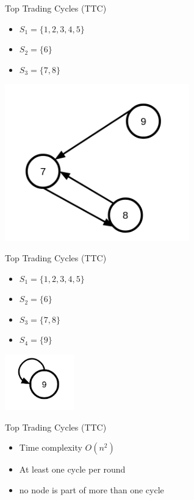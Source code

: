 \begin{frame}{Top Trading Cycles (TTC)}
    \begin{itemize}
    \item $S_1 = \{1,2,3,4,5\}$
    \item $S_2 = \{6\}$
    \item <2-> $S_3 = \{7,8\}$
    \end{itemize}   
    \centering
    \includegraphics[width=8cm]{img/ttc/ttc4.png}
\end{frame}
\begin{frame}{Top Trading Cycles (TTC)}
    \begin{itemize}
    \item $S_1 = \{1,2,3,4,5\}$
    \item $S_2 = \{6\}$
    \item $S_3 = \{7,8\}$
    \item <2-> $S_4 = \{9\}$
    \end{itemize}  
    \centering
    \includegraphics[width=3cm]{img/ttc/ttc5.png}
\end{frame}

\begin{frame}{Top Trading Cycles (TTC)}
    \begin{itemize}[<+->]
    \item Time complexity $O(n^2)$
    \item At least one cycle per round
    \item no node is part of more than one cycle
    \end{itemize}    
\end{frame}

